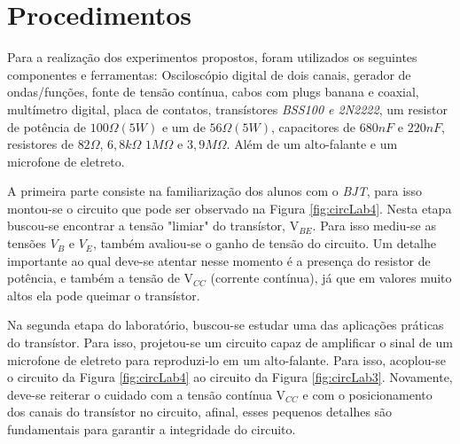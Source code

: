 \documentclass{article}
\begin{document}
    \section{Procedimentos}
        Para a realização dos experimentos propostos, foram utilizados os seguintes componentes e ferramentas: Osciloscópio digital de dois canais, gerador de ondas/funções, fonte de tensão contínua, cabos com plugs banana e coaxial, multímetro digital, placa de contatos, transístores \emph{BSS100 e 2N2222}, um resistor de potência de $100\Omega (5W)$ e um de $56\Omega (5W)$, capacitores de $680nF$ e $220nF$, resistores de $82\Omega$, $6,8k\Omega$ $1M\Omega$ e $3,9M\Omega$. Além de um alto-falante e um microfone de eletreto.
    
        A primeira parte consiste na familiarização dos alunos com o \emph{BJT}, para isso montou-se o circuito que pode ser observado na Figura \ref{fig:circLab4}. Nesta etapa buscou-se encontrar a tensão "limiar" do transístor, V$_{BE}$. Para isso mediu-se as tensões $V_B$ e $V_E$, também avaliou-se o ganho de tensão do circuito. Um detalhe importante ao qual deve-se atentar nesse momento é a presença do resistor de potência, e também a tensão de V$_{CC}$ (corrente contínua), já que em valores muito altos ela pode queimar o transístor.
    
        Na segunda etapa do laboratório, buscou-se estudar uma das aplicações práticas do transístor. Para isso, projetou-se um circuito capaz de amplificar o sinal de um microfone de eletreto para reproduzi-lo em um alto-falante. Para isso, acoplou-se o circuito da Figura \ref{fig:circLab4} ao circuito da Figura \ref{fig:circLab3}. Novamente, deve-se reiterar o cuidado com a tensão contínua V$_{CC}$ e com o posicionamento dos canais do transístor no circuito, afinal, esses pequenos detalhes são fundamentais para garantir a integridade do circuito.
    
\end{document}
